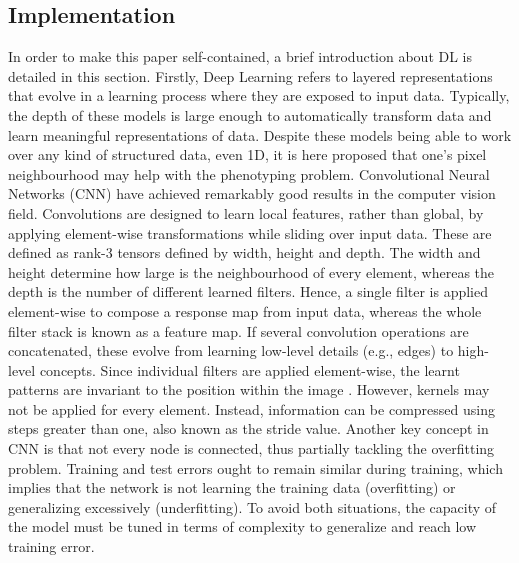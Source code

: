 \subsection{Implementation}

In order to make this paper self-contained, a brief introduction about DL is detailed in this section. Firstly, Deep Learning refers to layered representations that evolve in a learning process where they are exposed to input data. Typically, the depth of these models is large enough to automatically transform data and learn meaningful representations of data. Despite these models being able to work over any kind of structured data, even 1D, it is here proposed that one's pixel neighbourhood may help with the phenotyping problem. Convolutional Neural Networks (CNN) have achieved remarkably good results in the computer vision field. Convolutions are designed to learn local features, rather than global, by applying element-wise transformations while sliding over input data. These are defined as rank-3 tensors defined by width, height and depth. The width and height determine how large is the neighbourhood of every element, whereas the depth is the number of different learned filters. Hence, a single filter is applied element-wise to compose a response map from input data, whereas the whole filter stack is known as a feature map. If several convolution operations are concatenated, these evolve from learning low-level details (e.g., edges) to high-level concepts. Since individual filters are applied element-wise, the learnt patterns are invariant to the position within the image \cite{chollet_deep_2021}. However, kernels may not be applied for every element. Instead, information can be compressed using steps greater than one, also known as the stride value. Another key concept in CNN is that not every node is connected, thus partially tackling the overfitting problem. Training and test errors ought to remain similar during training, which implies that the network is not learning the training data (overfitting) or generalizing excessively (underfitting). To avoid both situations, the capacity of the model must be tuned in terms of complexity to generalize and reach low training error.  

